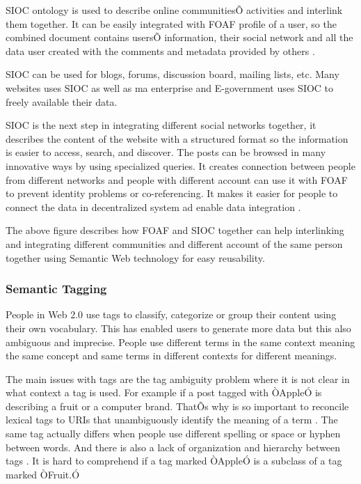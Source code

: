 SIOC ontology is used to describe online communitiesÕ activities and interlink them together. It can be easily integrated with FOAF profile of a user, so the combined document contains usersÕ information, their social network and all the data user created with the comments and metadata provided by others \cite{breslin2005towards}.

SIOC can be used for blogs, forums, discussion board, mailing lists, etc. Many websites uses SIOC as well as ma enterprise and E-government uses SIOC to freely available their data.

SIOC is the next step in integrating different social networks together, it describes the content of the website with a structured format so the information is easier to access, search, and discover. The posts can be browsed in many innovative ways by using specialized queries. It creates connection between people from different networks and people with different account can use it with FOAF to prevent identity problems or co-referencing. It makes it easier for people to connect the data in decentralized system ad enable data integration \cite{breslin2007future}.

The above figure describes how FOAF and SIOC together can help interlinking and integrating different communities and different account of the same person together using Semantic Web technology for easy reusability.


\subsubsection{Semantic Tagging}

People in Web 2.0 use tags to classify, categorize or group their content using their own vocabulary. This has enabled users to generate more data but this also ambiguous and imprecise.   People use different terms in the same context meaning the same concept and same terms in different contexts for different meanings.

The main issues with tags are the tag ambiguity problem where it is not clear in what context a tag is used. For example if a post tagged with ÒAppleÓ is describing a fruit or a computer brand. ThatÕs why is so important to reconcile lexical tags to URIs that unambiguously identify the meaning of a term \cite{garcia2009preliminary}. The same tag actually differs when people use different spelling or space or hyphen between words. And there is also a lack of organization and hierarchy between tags \cite{correndo2007survey}. It is hard to comprehend if a tag marked ÒAppleÓ is a subclass of a tag marked ÒFruit.Ó

